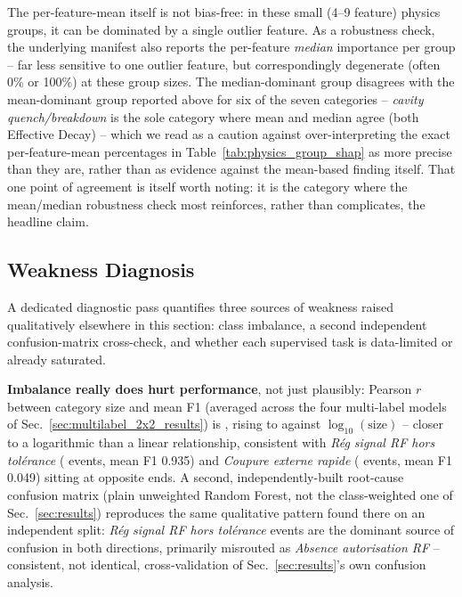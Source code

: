 The per-feature-mean itself is not bias-free: in these small (4--9 feature) physics groups, it can be dominated by a single outlier feature. As a robustness check, the underlying manifest also reports the per-feature \emph{median} importance per group -- far less sensitive to one outlier feature, but correspondingly degenerate (often 0\% or 100\%) at these group sizes. The median-dominant group disagrees with the mean-dominant group reported above for six of the seven categories -- \textit{cavity quench/breakdown} is the sole category where mean and median agree (both Effective Decay) -- which we read as a caution against over-interpreting the exact per-feature-mean percentages in Table~\ref{tab:physics_group_shap} as more precise than they are, rather than as evidence against the mean-based finding itself. That one point of agreement is itself worth noting: it is the category where the mean/median robustness check most reinforces, rather than complicates, the headline claim. %

\subsection{Weakness Diagnosis}
\label{sec:weakness_diagnosis}

A dedicated diagnostic pass quantifies three sources of weakness raised qualitatively elsewhere in this section: class imbalance, a second independent confusion-matrix cross-check, and whether each supervised task is data-limited or already saturated.

\textbf{Imbalance really does hurt performance}, not just plausibly: Pearson $r$ between category size and mean F1 (averaged across the four multi-label models of Sec.~\ref{sec:multilabel_2x2_results}) is \MetricOneZeroPhaseThreeWeaknessDiagnosisImbalancePearsonR{}, rising to \MetricOneZeroPhaseThreeWeaknessDiagnosisImbalancePearsonRLog{} against $\log_{10}(\text{size})$ -- closer to a logarithmic than a linear relationship, consistent with \textit{Rég signal RF hors tolérance} (\MetricZeroZeroDataAttritionChainGtPassingRGSignalRfHorsTolRance{} events, mean F1 0.935) and \textit{Coupure externe rapide} (\MetricZeroZeroDataAttritionChainGtPassingCoupureExterneRapide{} events, mean F1 0.049) %
sitting at opposite ends. A second, independently-built root-cause confusion matrix (plain unweighted Random Forest, not the class-weighted one of Sec.~\ref{sec:results}) reproduces the same qualitative pattern found there on an independent split: \textit{Rég signal RF hors tolérance} events are the dominant source of confusion in both directions, primarily misrouted as \textit{Absence autorisation RF} -- consistent, not identical, cross-validation of Sec.~\ref{sec:results}'s own confusion analysis.

